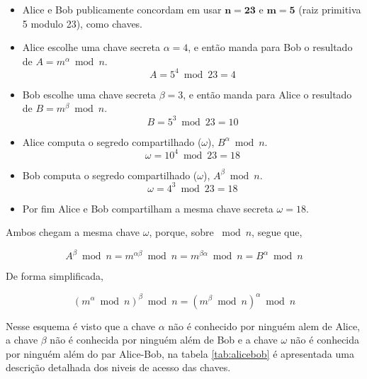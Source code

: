 \documentclass{article}
\begin{document}
\begin{itemize}
    \item Alice e Bob publicamente concordam em usar $\boldsymbol{n = 23}$ e
        $\boldsymbol{m = 5}$ (raiz primitiva 5 modulo 23), como chaves.
    \item Alice escolhe uma chave secreta $\alpha=4$, e então manda para Bob o
        resultado de $A = {m}^{\alpha}\bmod n$.
        \begin{equation}
            A = 5^4\bmod23 = 4
        \end{equation}
    \item Bob escolhe uma chave secreta $\beta=3$, e então manda para Alice o
        resultado de $B = {m}^{\beta}\bmod n$.
        \begin{equation}
            B = 5^3\bmod23 = 10
        \end{equation}
    \item Alice computa o segredo compartilhado ($\omega$), $B^\alpha \bmod n$.
        \begin{equation}
            \omega = 10^4\bmod23 = 18
        \end{equation}
    \item Bob computa o segredo compartilhado ($\omega$), $A^\beta \bmod n$.
        \begin{equation}
            \omega = 4^3\bmod23 = 18
        \end{equation}
    \item Por fim Alice e Bob compartilham a mesma chave secreta $\omega = 18$.
\end{itemize}

Ambos chegam a mesma chave $\omega$, porque, sobre $\bmod n$, segue que,

\begin{equation}
    A^{\beta}\bmod n = m^{\alpha\beta}\bmod n = m^{\beta\alpha}\bmod n = B^{\alpha}\bmod n
\end{equation}

De forma simplificada,

\begin{equation}
    (m ^\alpha \bmod n)^\beta \bmod n = (m^\beta \bmod n)^\alpha \bmod n
\end{equation}

Nesse esquema é visto que a chave $\alpha$ não é conhecido por ninguém alem de Alice,
a chave $\beta$ não é conhecida por ninguém além de Bob e a chave $\omega$ não
é conhecida por ninguém além do par Alice-Bob, na tabela \ref{tab:alicebob} é
apresentada uma descrição detalhada dos niveis de acesso das chaves.
\end{document}
